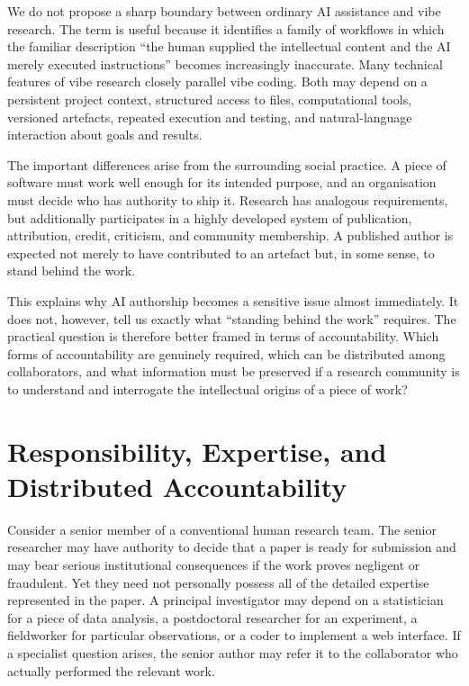 \documentclass[12pt]{article}
\begin{document}
We do not propose a sharp boundary between ordinary AI assistance and vibe research. The term is useful because it identifies a family of workflows in which the familiar description ``the human supplied the intellectual content and the AI merely executed instructions'' becomes increasingly inaccurate.
Many technical features of vibe research closely parallel vibe coding. Both may depend on a persistent project context, structured access to files, computational tools, versioned artefacts, repeated execution and testing, and natural-language interaction about goals and results.

The important differences arise from the surrounding social practice.
A piece of software must work well enough for its intended purpose, and an organisation must decide who has authority to ship it. Research has analogous requirements, but additionally participates in a highly developed system of publication, attribution, credit, criticism, and community membership. A published author is expected not merely to have contributed to an artefact but, in some sense, to stand behind the work.

This explains why AI authorship becomes a sensitive issue almost immediately. It does not, however, tell us exactly what ``standing behind the work'' requires.
The practical question is therefore better framed in terms of accountability. Which forms of accountability are genuinely required, which can be distributed among collaborators, and what information must be preserved if a research community is to understand and interrogate the intellectual origins of a piece of work?

\section{Responsibility, Expertise, and Distributed Accountability}

Consider a senior member of a conventional human research team.
The senior researcher may have authority to decide that a paper is ready for submission and may bear serious institutional consequences if the work proves negligent or fraudulent. Yet they need not personally possess all of the detailed expertise represented in the paper.
A principal investigator may depend on a statistician for a piece of data analysis, a postdoctoral researcher for an experiment, a fieldworker for particular observations, or a coder to implement a web interface. If a specialist question arises, the senior author may refer it to the collaborator who actually performed the relevant work.
\end{document}
